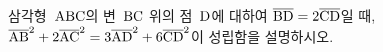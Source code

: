 \noindent\begin{minipage}[t]{0.58\linewidth}\vspace{0pt}\raggedright 삼각형~$\mathrm{ABC}$의 변~$\mathrm{BC}$ 위의 점~$\mathrm{D}$에 대하여 $\overline{\mathrm{BD}}=2\overline{\mathrm{CD}}$일 때, $\overline{\mathrm{AB}}^2+2\overline{\mathrm{AC}}^2=3\overline{\mathrm{AD}}^2+6\overline{\mathrm{CD}}^2$이 성립함을 설명하시오.\end{minipage}\hfill\begin{minipage}[t]{0.4\linewidth}\vspace{0pt}\centering \resizebox{\ifdim\width>\linewidth\linewidth\else\width\fi}{!}{}\end{minipage}\par

